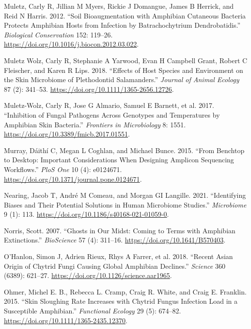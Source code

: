 \documentclass[
  12pt,
]{article}
\newlength{\cslhangindent}
\newenvironment{CSLReferences}[2] %
 {\begin{list}{}{%
  \setlength{\itemindent}{0pt}
  \setlength{\leftmargin}{0pt}
  \setlength{\parsep}{0pt}
  \ifodd #1
   \setlength{\leftmargin}{\cslhangindent}
   \setlength{\itemindent}{-1\cslhangindent}
  \fi
  \setlength{\itemsep}{#2\baselineskip}}}
 {\end{list}}
\begin{document}
\begin{CSLReferences}{1}{1}
Muletz, Carly R, Jillian M Myers, Rickie J Domangue, James B Herrick,
and Reid N Harris. 2012. {``Soil Bioaugmentation with Amphibian
Cutaneous Bacteria Protects Amphibian Hosts from Infection by
{Batrachochytrium} Dendrobatidis.''} \emph{Biological Conservation} 152:
119--26. \url{https://doi.org/10.1016/j.biocon.2012.03.022}.

Muletz Wolz, Carly R, Stephanie A Yarwood, Evan H Campbell Grant, Robert
C Fleischer, and Karen R Lips. 2018. {``Effects of Host Species and
Environment on the Skin Microbiome of {Plethodontid} Salamanders.''}
\emph{Journal of Animal Ecology} 87 (2): 341--53.
\url{https://doi.org/10.1111/1365-2656.12726}.

Muletz-Wolz, Carly R, Jose G Almario, Samuel E Barnett, et al. 2017.
{``Inhibition of Fungal Pathogens Across Genotypes and Temperatures by
Amphibian Skin Bacteria.''} \emph{Frontiers in Microbiology} 8: 1551.
\url{https://doi.org/10.3389/fmicb.2017.01551}.

Murray, Dáithí C, Megan L Coghlan, and Michael Bunce. 2015. {``From
Benchtop to Desktop: Important Considerations When Designing Amplicon
Sequencing Workflows.''} \emph{PloS One} 10 (4): e0124671.
\url{https://doi.org/10.1371/journal.pone.0124671}.

Nearing, Jacob T, André M Comeau, and Morgan GI Langille. 2021.
{``Identifying Biases and Their Potential Solutions in Human Microbiome
Studies.''} \emph{Microbiome} 9 (1): 113.
\url{https://doi.org/10.1186/s40168-021-01059-0}.

Norris, Scott. 2007. {``Ghosts in Our Midst: Coming to Terms with
Amphibian Extinctions.''} \emph{BioScience} 57 (4): 311--16.
\url{https://doi.org/10.1641/B570403}.

{O'Hanlon, Simon J, Adrien Rieux, Rhys A Farrer, et al.} 2018. {``Recent
{Asian} Origin of Chytrid Fungi Causing Global Amphibian Declines.''}
\emph{Science} 360 (6389): 621--27.
\url{https://doi.org/10.1126/science.aar1965}.

Ohmer, Michel E. B., Rebecca L. Cramp, Craig R. White, and Craig E.
Franklin. 2015. {``Skin Sloughing Rate Increases with Chytrid Fungus
Infection Load in a Susceptible Amphibian.''} \emph{Functional Ecology}
29 (5): 674--82. \url{https://doi.org/10.1111/1365-2435.12370}.


\end{CSLReferences}
\end{document}
